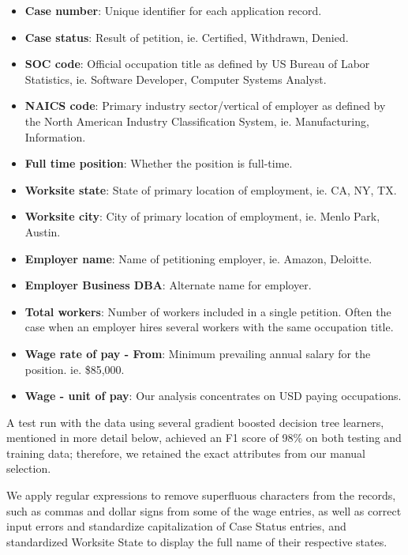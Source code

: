 \documentclass[sigconf]{acmart}
\begin{document}
  \begin{itemize}
    
  \item \textbf{Case number}: Unique identifier for each application record.
  \item \textbf{Case status}: Result of petition, 
  ie. Certified, Withdrawn, Denied. 
  \item \textbf{SOC code}: Official occupation title as defined by US Bureau of Labor Statistics, 
  ie. Software Developer, Computer Systems Analyst.
  \item \textbf{NAICS code}: Primary industry sector/vertical of employer as defined by 
  the North American Industry Classification System, 
  ie. Manufacturing, Information.
  \item \textbf{Full time position}: Whether the position is full-time.
  \item \textbf{Worksite state}: State of primary location of employment,
  ie. CA, NY, TX.
  \item \textbf{Worksite city}: City of primary location of employment, 
  ie. Menlo Park, Austin.
  \item \textbf{Employer name}: Name of petitioning employer,
  ie. Amazon, Deloitte.
  \item \textbf{Employer Business DBA}: Alternate name for employer. 
  \item \textbf{Total workers}: Number of workers included in a single petition. 
  Often the case when an employer hires several workers with the same occupation title. 
  \item \textbf{Wage rate of pay - From}: Minimum prevailing annual salary for the position.
  ie. \$85,000.
  \item \textbf{Wage - unit of pay}: Our analysis concentrates on USD paying occupations.

  \end{itemize}

A test run with the data using several gradient boosted decision tree learners, 
mentioned in more detail below, achieved an F1 score of 98\% on both testing 
and training data; therefore, we retained the exact attributes from our manual selection. 


We apply regular expressions to remove superfluous characters from the records, 
such as commas and dollar signs from some of the wage entries, 
as well as correct input errors and standardize capitalization of Case Status entries, 
and standardized Worksite State to display the full name of their respective states.  
\end{document}
